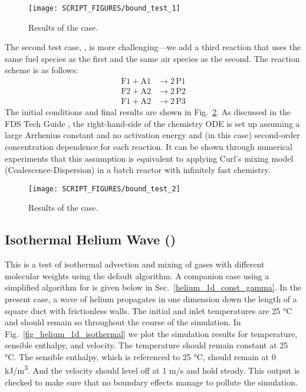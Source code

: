 \documentclass[11pt]{book}
\begin{document}
\begin{figure}[!ht]
   \centering
   \texttt{[image: SCRIPT\_FIGURES/bound\_test\_1]}
   \caption[Results of the  case]{Results of the  case.}
   \label{fig:bound_test_1}
\end{figure}

The second test case, , is more challenging---we add a third reaction that uses the same fuel species as the first and the same air species as the second.  The reaction scheme is as follows:
\begin{align}
\mathrm{F1} + \mathrm{A1} &\rightarrow 2\,\mathrm{P1} \\
\mathrm{F2} + \mathrm{A2} &\rightarrow 2\,\mathrm{P2} \\
\mathrm{F1} + \mathrm{A2} &\rightarrow 2\,\mathrm{P3}
\end{align}
The initial conditions and final results are shown in Fig.~\ref{fig:bound_test_2}.  As discussed in the FDS Tech Guide \cite{FDS_Math_Guide}, the right-hand-side of the chemistry ODE is set up assuming a large Arrhenius constant and no activation energy and (in this case) second-order concentration dependence for each reaction.  It can be shown through numerical experiments that this assumption is equivalent to applying Curl's mixing model (Coalescence-Dispersion) \cite{Curl:1} in a batch reactor with infinitely fast chemistry.
\begin{figure}[!ht]
   \centering
   \texttt{[image: SCRIPT\_FIGURES/bound\_test\_2]}
   \caption[Results of the  case]{Results of the  case.}
   \label{fig:bound_test_2}
\end{figure}

\subsection{Isothermal Helium Wave (\texorpdfstring{}{helium_1d_isothermal})}
\label{helium_1d_isothermal}
\label{helium_2d_isothermal}

This is a test of isothermal advection and mixing of gases with different molecular weights using the default algorithm.  A companion case using a simplified algorithm for  is given below in Sec.~\ref{helium_1d_const_gamma}.  In the present case, a wave of helium propagates in one dimension down the length of a square duct with frictionless walls.  The initial and inlet temperatures are 25 \si{\degreeCelsius} and should remain so throughout the course of the simulation. In Fig.~\ref{fig_helium_1d_isothermal} we plot the simulation results for temperature, sensible enthalpy, and velocity.  The temperature should remain constant at 25 \si{\degreeCelsius}.  The sensible enthalpy, which is referenced to 25 \si{\degreeCelsius}, should remain at 0 \si{kJ/m^3}.  And the velocity should level off at 1 m/s and hold steady.  This output is checked to make sure that no boundary effects manage to pollute the simulation.
\end{document}
